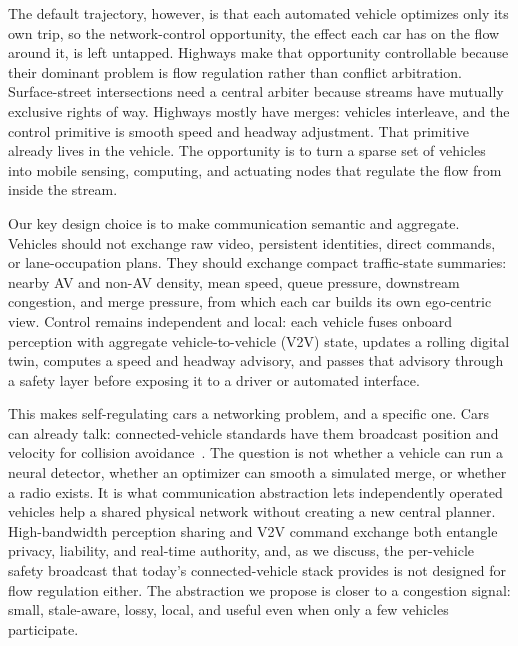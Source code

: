 The default trajectory, however, is that each automated vehicle optimizes only its own trip, so the network-control opportunity, the effect each car has on the flow around it, is left untapped. Highways make that opportunity controllable because their dominant problem is flow regulation rather than conflict arbitration. Surface-street intersections need a central arbiter because streams have mutually exclusive rights of way. Highways mostly have merges: vehicles interleave, and the control primitive is smooth speed and headway adjustment. That primitive already lives in the vehicle. The opportunity is to turn a sparse set of vehicles into mobile sensing, computing, and actuating nodes that regulate the flow from inside the stream.

Our key design choice is to make communication semantic and aggregate. Vehicles should not exchange raw video, persistent identities, direct commands, or lane-occupation plans. They should exchange compact traffic-state summaries: nearby AV and non-AV density, mean speed, queue pressure, downstream congestion, and merge pressure, from which each car builds its own ego-centric view. Control remains independent and local: each vehicle fuses onboard perception with aggregate vehicle-to-vehicle (V2V) state, updates a rolling digital twin, computes a speed and headway advisory, and passes that advisory through a safety layer before exposing it to a driver or automated interface.

This makes self-regulating cars a networking problem, and a specific one. Cars can already talk: connected-vehicle standards have them broadcast position and velocity for collision avoidance~\cite{sae2020j2735,etsi2019cam}. The question is not whether a vehicle can run a neural detector, whether an optimizer can smooth a simulated merge, or whether a radio exists. It is what communication abstraction lets independently operated vehicles help a shared physical network without creating a new central planner. High-bandwidth perception sharing and V2V command exchange both entangle privacy, liability, and real-time authority, and, as we discuss, the per-vehicle safety broadcast that today's connected-vehicle stack provides is not designed for flow regulation either. The abstraction we propose is closer to a congestion signal: small, stale-aware, lossy, local, and useful even when only a few vehicles participate.

